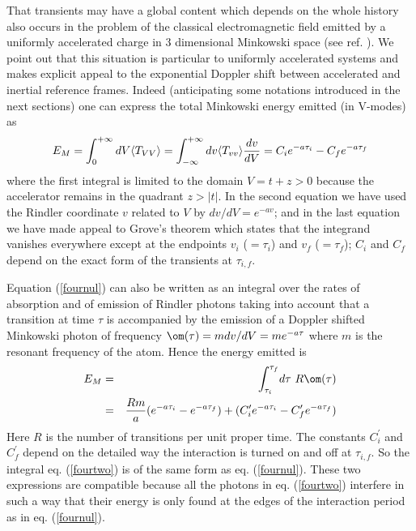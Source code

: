 \documentclass[12pt]{article}
\begin{document}
That transients may have a global content
which
depends on the whole history also occurs in the problem of the classical
electromagnetic field emitted by a uniformly accelerated charge in 3
dimensional Minkowski space (see ref. \cite{Boul2}). We point out that
this situation is
particular to uniformly accelerated systems and makes explicit appeal to the
exponential Doppler shift between accelerated and inertial reference
frames. Indeed (anticipating some notations introduced in the next sections)
one can express the total Minkowski energy emitted (in
V-modes) as \begin{eqnarray}
E_M = \int_0^{+\infty}
dV \langle T_{VV}\rangle
=
\int_{ - \infty}^{+ \infty} dv
\langle T_{vv}\rangle {dv \over dV}
= C_i e^{-a \tau_i}-
C_f e^{-a \tau_f} \label{fournul} \end{eqnarray}
where the first integral
is
limited to the domain $V=t+z>0$ because the accelerator remains in the quadrant
$z>|t|$.
In the second equation we have used the Rindler coordinate $v$
related to $V$ by $dv / dV = e^{-av}$; and in the
last equation we have made appeal to Grove's theorem which states that the
integrand vanishes everywhere except at the endpoints $v_i$ ($= \tau_i $) and
$v_f$ ($= \tau_f $); $C_i$ and $C_f$ depend on the exact form of the
transients at $\tau_{i,f}$.

 Equation (\ref{fournul}) can also be written as an
integral over the rates of absorption and of emission of Rindler
photons taking into account that a transition at time $\tau$ is accompanied by
the emission of a Doppler shifted Minkowski photon of frequency $\om(\tau) = m
dv/dV=me^{-a\tau}$ where $m$ is the resonant frequency of the atom. Hence the
energy emitted is \begin{eqnarray}
E_M &=& \int_{\tau_i}^{\tau_f}\! d\tau \ R\/
\om(\tau)
\nonumber\\
&=&{R\/m \over a}( e^{-a \tau_i} - e^{-a\tau_f } ) +( C^\prime_i e^{-a \tau_i}
- C^\prime_f e^{-a \tau_f}
)
\label{fourtwo}
\end{eqnarray}
Here $R$ is the number of transitions per unit proper time.  The constants
$C^\prime_i$ and $C^\prime_f$
 depend on the detailed way the interaction is turned on and off at
$\tau_{i,f}$. So the integral eq. (\ref{fourtwo}) is
of the same form as eq. (\ref{fournul}).  These two   expressions are
compatible because all the photons  in  eq. (\ref{fourtwo}) interfere in such
a way that  their energy is only found at the edges  of
the
interaction period as in eq. (\ref{fournul}).
\end{document}
